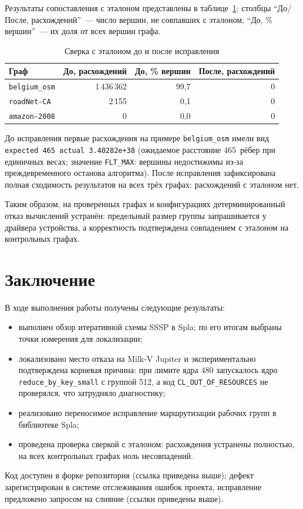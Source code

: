 \documentclass[a4paper]{article}
\begin{document}
Результаты сопоставления с эталоном представлены в таблице~\ref{tab:verify}: столбцы \enquote{До/После, расхождений}~--- число вершин, не совпавших с эталоном, \enquote{До, \% вершин}~--- их доля от всех вершин графа.

\begin{table}[htbp]
    \centering
    \caption{Сверка с эталоном до и после исправления}
    \label{tab:verify}
    \begin{tabular}{lrrr}
        \toprule
        \textbf{Граф} & \textbf{До, расхождений} & \textbf{До, \% вершин} & \textbf{После, расхождений} \\
        \midrule
        \texttt{belgium\_osm} & 1\,436\,362 & 99,7 & 0 \\
        \texttt{roadNet-CA} & 2\,155 & 0,1 & 0 \\
        \texttt{amazon-2008} & 0 & 0,0 & 0 \\
        \bottomrule
    \end{tabular}
\end{table}

До исправления первые расхождения на примере \texttt{belgium\_osm} имели вид \texttt{expected 465 actual 3.40282e+38} (ожидаемое расстояние 465~рёбер при единичных весах; значение \texttt{FLT\_MAX}: вершины недостижимы из-за преждевременного останова алгоритма). После исправления зафиксирована полная сходимость результатов на всех трёх графах: расхождений с эталоном нет.

Таким образом, на проверенных графах и конфигурациях детерминированный отказ вычислений устранён: предельный размер группы запрашивается у драйвера устройства, а корректность подтверждена совпадением с эталоном на контрольных графах.

\section{Заключение}

В ходе выполнения работы получены следующие результаты:
\begin{itemize}
    \item выполнен обзор итеративной схемы SSSP в Spla; по его итогам выбраны точки измерения для локализации;
    \item локализовано место отказа на Milk-V Jupiter и экспериментально подтверждена корневая причина: при лимите ядра 480 запускалось ядро \texttt{reduce\_by\_key\_small} с группой 512, а код \texttt{CL\_OUT\_OF\_RESOURCES} не проверялся, что затрудняло диагностику;
    \item реализовано переносимое исправление маршрутизации рабочих групп в библиотеке Spla;
    \item проведена проверка сверкой с эталоном: расхождения устранены полностью, на всех контрольных графах ноль несовпадений.
\end{itemize}

Код доступен в форке репозитория (ссылка приведена выше); дефект зарегистрирован в системе отслеживания ошибок проекта, исправление предложено запросом на слияние (ссылки приведены выше).
\end{document}
